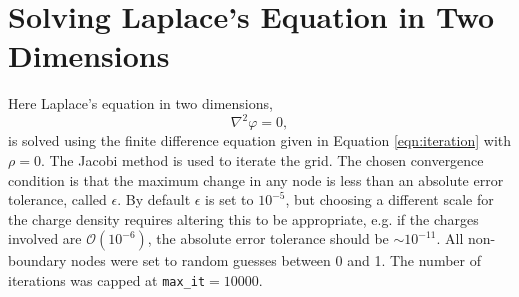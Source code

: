 \section{Solving Laplace's Equation in Two Dimensions}
\label{sec:laplace}

Here Laplace's equation in two dimensions,
\begin{equation}
    \nabla^2 \varphi = 0,
\end{equation}
is solved using the finite difference equation given in Equation \ref{eqn:iteration} with $\rho = 0$. The Jacobi method is used to iterate the grid. The chosen convergence condition is that the maximum change in any node is less than an absolute error tolerance, called $\epsilon$. By default $\epsilon$ is set to $10^{-5}$, but choosing a different scale for the charge density requires altering this to be appropriate, e.g. if the charges involved are $\mathcal{O}(10^{-6})$, the absolute error tolerance should be $\sim 10^{-11}$. All non-boundary nodes were set to random guesses between 0 and 1. The number of iterations was capped at \texttt{max\_it}$=10000$.
